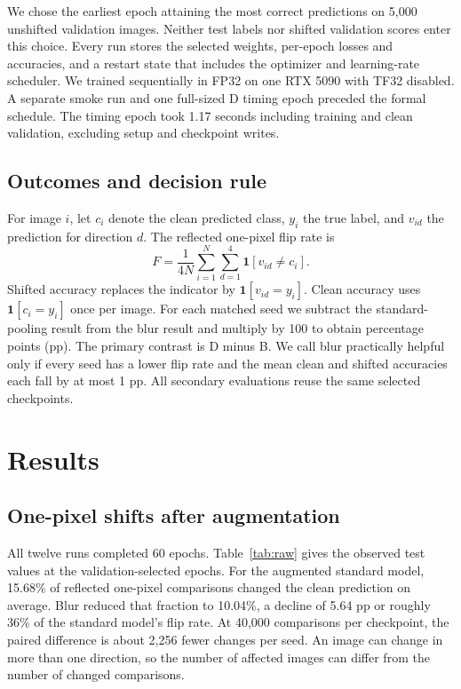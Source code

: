 \documentclass[conference]{IEEEtran}
\begin{document}
We chose the earliest epoch attaining the most correct predictions on 5,000 unshifted validation images. Neither test labels nor shifted validation scores enter this choice. Every run stores the selected weights, per-epoch losses and accuracies, and a restart state that includes the optimizer and learning-rate scheduler. We trained sequentially in FP32 on one RTX 5090 with TF32 disabled. A separate smoke run and one full-sized D timing epoch preceded the formal schedule. The timing epoch took 1.17 seconds including training and clean validation, excluding setup and checkpoint writes.

\subsection{Outcomes and decision rule}
For image $i$, let $c_i$ denote the clean predicted class, $y_i$ the true label, and $v_{id}$ the prediction for direction $d$. The reflected one-pixel flip rate is
\[
 F=\frac{1}{4N}\sum_{i=1}^{N}\sum_{d=1}^{4}\mathbf{1}[v_{id}\ne c_i].
\]
Shifted accuracy replaces the indicator by $\mathbf{1}[v_{id}=y_i]$. Clean accuracy uses $\mathbf{1}[c_i=y_i]$ once per image. For each matched seed we subtract the standard-pooling result from the blur result and multiply by 100 to obtain percentage points (pp). The primary contrast is D minus B. We call blur practically helpful only if every seed has a lower flip rate and the mean clean and shifted accuracies each fall by at most 1 pp. All secondary evaluations reuse the same selected checkpoints.

\section{Results}


\subsection{One-pixel shifts after augmentation}
All twelve runs completed 60 epochs. Table~\ref{tab:raw} gives the observed test values at the validation-selected epochs. For the augmented standard model, 15.68\% of reflected one-pixel comparisons changed the clean prediction on average. Blur reduced that fraction to 10.04\%, a decline of 5.64 pp or roughly 36\% of the standard model's flip rate. At 40,000 comparisons per checkpoint, the paired difference is about 2,256 fewer changes per seed. An image can change in more than one direction, so the number of affected images can differ from the number of changed comparisons.
\end{document}
